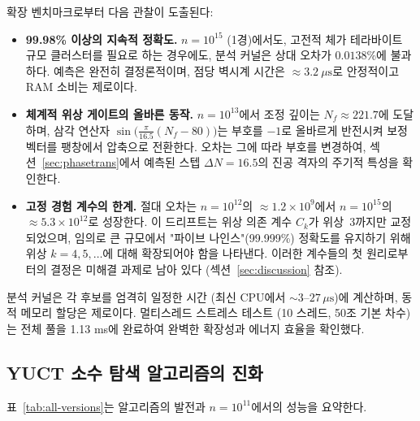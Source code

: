 \documentclass[11pt,a4paper]{article}
\begin{document}
	확장 벤치마크로부터 다음 관찰이 도출된다:
	
	\begin{itemize}
		\item \textbf{99.98\% 이상의 지속적 정확도.}
		\(n = 10^{15}\) (1경)에서도, 고전적 체가 테라바이트 규모 클러스터를 필요로 하는 경우에도, 분석 커널은 상대 오차가 \(0.0138\%\)에 불과하다. 예측은 완전히 결정론적이며, 점당 벽시계 시간은 \(\approx 3.2\ \mu\text{s}\)로 안정적이고 RAM 소비는 제로이다.
		
		\item \textbf{체계적 위상 게이트의 올바른 동작.}
		\(n = 10^{13}\)에서 조정 깊이는 \(N_f \approx 221.7\)에 도달하며, 삼각 연산자 \(\sin\!\bigl(\frac{\pi}{16.5}(N_f-80)\bigr)\)는 부호를 \(-1\)로 올바르게 반전시켜 보정 벡터를 팽창에서 압축으로 전환한다. 오차는 그에 따라 부호를 변경하여, 섹션~\ref{sec:phasetrans}에서 예측된 스텝 \(\Delta N = 16.5\)의 진공 격자의 주기적 특성을 확인한다.
		
		\item \textbf{고정 경험 계수의 한계.}
		절대 오차는 \(n = 10^{12}\)의 \(\approx 1.2\times 10^{9}\)에서 \(n = 10^{15}\)의 \(\approx 5.3\times 10^{12}\)로 성장한다. 이 드리프트는 위상 의존 계수 \(C_k\)가 위상~3까지만 교정되었으며, 임의로 큰 규모에서 "파이브 나인스"(99.999\%) 정확도를 유지하기 위해 위상 \(k = 4, 5, \dots\)에 대해 확장되어야 함을 나타낸다. 이러한 계수들의 첫 원리로부터의 결정은 미해결 과제로 남아 있다 (섹션~\ref{sec:discussion} 참조).
	\end{itemize}
	
	분석 커널은 각 후보를 엄격히 일정한 시간 (최신 CPU에서 \(\sim 3\)--\(27\,\mu\text{s}\))에 계산하며, 동적 메모리 할당은 제로이다. 멀티스레드 스트레스 테스트 (10 스레드, 50조 기본 차수)는 전체 풀을 1.13 ms에 완료하여 완벽한 확장성과 에너지 효율을 확인했다.
	
	\subsection{YUCT 소수 탐색 알고리즘의 진화}
	표~\ref{tab:all-versions}는 알고리즘의 발전과 \(n=10^{11}\)에서의 성능을 요약한다.
	
\end{document}
